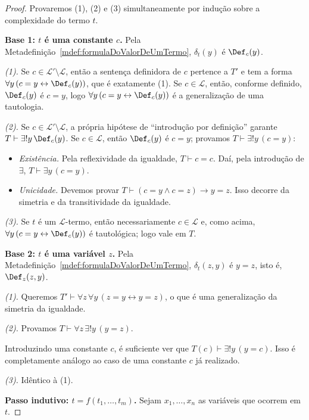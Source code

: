\begin{proof}
Provaremos (1), (2) e (3) simultaneamente por indução sobre a complexidade do termo $t$.

\smallskip
\textbf{Base 1: $t$ é uma constante $c$.}
 Pela Metadefinição~\ref{mdef:formulaDoValorDeUmTermo}, $\delta_t(y)$ é $\Def_c(y)$.

\emph{(1).} Se $c\in\mathcal L'\setminus\mathcal L$, então a sentença definidora de $c$ pertence a $T'$ e tem a forma
$\forall y\,(c=y\leftrightarrow \Def_c(y))$, que é exatamente (1).
Se $c\in\mathcal L$, então, conforme definido, $\Def_c(y)$ é $c=y$, logo
$\forall y\,(c=y\leftrightarrow \Def_c(y))$ é a generalização de uma tautologia.

\emph{(2).} Se $c\in \mathcal L'\setminus \mathcal L$, a própria hipótese de ``introdução por definição'' garante
$T\vdash \exists!y\,\Def_c(y)$.
Se $c\in\mathcal L$, então $\Def_c(y)$ é $c=y$; provamos $T\vdash \exists!y\,(c=y)$:
\begin{itemize}
    \item \emph{Existência.} Pela reflexividade da igualdade, $T\vdash c=c$.
    Daí, pela introdução de $\exists$, $T\vdash \exists y\,(c=y)$.
    \item \emph{Unicidade.} Devemos provar $T\vdash (c=y\wedge c=z)\rightarrow y=z$.
    Isso decorre da simetria e da transitividade da igualdade.
\end{itemize}

\emph{(3).} Se $t$ é um $\mathcal L$-termo, então necessariamente $c\in\mathcal L$ e, como acima,
$\forall y\,(c=y\leftrightarrow \Def_c(y))$ é tautológica; logo vale em $T$.

\smallskip
\textbf{Base 2: $t$ é uma variável $z$.}
Pela Metadefinição~\ref{mdef:formulaDoValorDeUmTermo}, $\delta_t(z,y)$ é $y=z$, isto é, $\Def_{z}(z,y)$.

\emph{(1).} Queremos $T'\vdash \forall z\,\forall y\,(z=y\leftrightarrow y=z)$, o que é uma generalização da simetria da igualdade.

\emph{(2).} Provamos $T\vdash \forall z\,\exists!y\,(y=z)$.

Introduzindo uma constante $c$, é suficiente ver que $T(c)\vdash \exists!y\,(y=c)$.
Isso é completamente análogo ao caso de uma constante $c$ já realizado.

\emph{(3).} Idêntico à (1).

\smallskip
\textbf{Passo indutivo: $t=f(t_1,\ldots,t_m)$.}
Sejam $x_1,\ldots,x_n$ as variáveis que ocorrem em $t$.


\end{proof}
